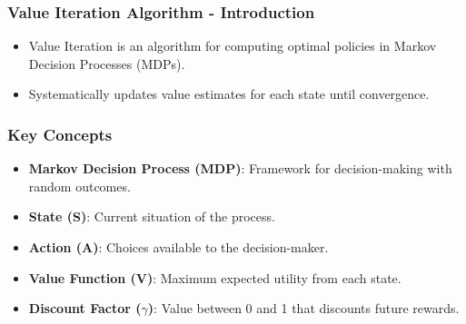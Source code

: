 \documentclass{beamer}
\begin{document}
\begin{frame}[fragile]
    \frametitle{Value Iteration Algorithm - Introduction}
    \begin{itemize}
        \item Value Iteration is an algorithm for computing optimal policies in Markov Decision Processes (MDPs).
        \item Systematically updates value estimates for each state until convergence.
    \end{itemize}
\end{frame}

\begin{frame}[fragile]
    \frametitle{Key Concepts}
    \begin{itemize}
        \item \textbf{Markov Decision Process (MDP)}: Framework for decision-making with random outcomes.
        \item \textbf{State (S)}: Current situation of the process.
        \item \textbf{Action (A)}: Choices available to the decision-maker.
        \item \textbf{Value Function (V)}: Maximum expected utility from each state.
        \item \textbf{Discount Factor ($\gamma$)}: Value between 0 and 1 that discounts future rewards.
    \end{itemize}
\end{frame}
\end{document}
